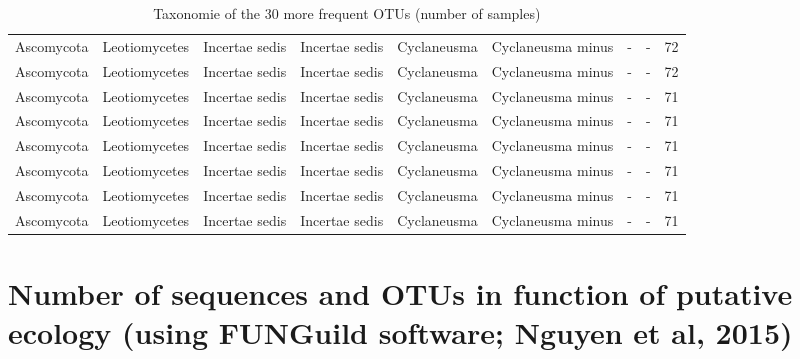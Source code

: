 \documentclass[12pt]{article}\usepackage[]{graphicx}\usepackage[]{color}
\numberwithin{figure}{section}
\begin{document}
\begin{landscape}
\begin{table}[ht]
\begin{tabular}{llllllllr}
  Ascomycota & Leotiomycetes & Incertae sedis & Incertae sedis & Cyclaneusma & Cyclaneusma minus & - & - & 72 \\ 
  Ascomycota & Leotiomycetes & Incertae sedis & Incertae sedis & Cyclaneusma & Cyclaneusma minus & - & - & 72 \\ 
  Ascomycota & Leotiomycetes & Incertae sedis & Incertae sedis & Cyclaneusma & Cyclaneusma minus & - & - & 71 \\ 
  Ascomycota & Leotiomycetes & Incertae sedis & Incertae sedis & Cyclaneusma & Cyclaneusma minus & - & - & 71 \\ 
  Ascomycota & Leotiomycetes & Incertae sedis & Incertae sedis & Cyclaneusma & Cyclaneusma minus & - & - & 71 \\ 
  Ascomycota & Leotiomycetes & Incertae sedis & Incertae sedis & Cyclaneusma & Cyclaneusma minus & - & - & 71 \\ 
  Ascomycota & Leotiomycetes & Incertae sedis & Incertae sedis & Cyclaneusma & Cyclaneusma minus & - & - & 71 \\ 
  Ascomycota & Leotiomycetes & Incertae sedis & Incertae sedis & Cyclaneusma & Cyclaneusma minus & - & - & 71 \\ 
   \hline
\end{tabular}
\endgroup
\caption{Taxonomie of the 30 more frequent OTUs (number of samples)} 
\end{table}

\end{landscape}


\section{Number of sequences and OTUs in function of putative ecology (using FUNGuild software; Nguyen et al, 2015)}
\end{document}
